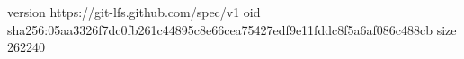 version https://git-lfs.github.com/spec/v1
oid sha256:05aa3326f7dc0fb261c44895c8e66cea75427edf9e11fddc8f5a6af086c488cb
size 262240
